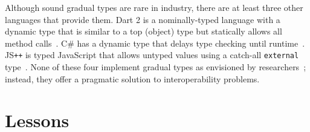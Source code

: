 \documentclass[english,cleveref,submission]{programming}
\newcommand{\JSPP}{JS\code{++}}
\newcommand{\code}[1]{\texttt{#1}}
\begin{document}
Although sound gradual types are rare in industry, there are at
least three other languages that provide them.
Dart 2 is a nominally-typed language with a dynamic type that is similar
to a top (object) type but statically allows all method calls~\cite{dart-types}.
C\# has a dynamic type that delays type checking until runtime~\cite{bmt-ecoop-2010}.
\JSPP{} is typed JavaScript that allows untyped values
using a catch-all \code{external} type~\cite{jspp}.
None of these four implement gradual types as envisioned by researchers~\cite{st-sfp-2006,tf-dls-2006,mf-toplas-2009,gktff-sfp-2006};
instead, they offer a pragmatic solution to interoperability problems.




\section{Lessons}
\label{s:conclusion}
\end{document}
